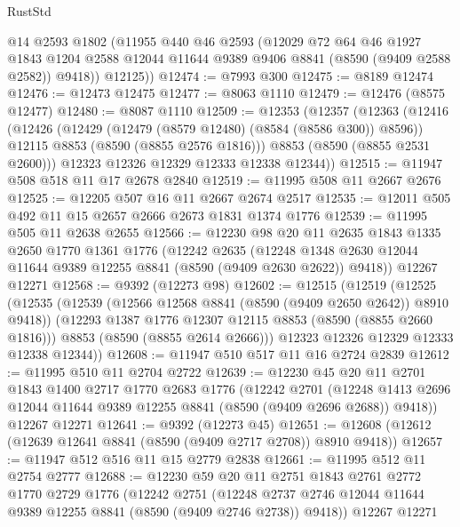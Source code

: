 \begin{lexlean}{RustStd}
\begin{coremodule}
        @14
        @2593
        @1802
        (@11955
          @440
          @46
          @2593
          (@12029
            @72
            @64
            @46
            @1927
            @1843
            @1204
            @2588
            @12044
            @11644
            @9389
            @9406
            @8841
            (@8590 (@9409 @2588 @2582))
            @9418))
        @12125))
@12474 := @7993 @300
@12475 := @8189 @12474
@12476 := @12473 @12475
@12477 := @8063 @1110
@12479 := @12476 (@8575 @12477)
@12480 := @8087 @1110
@12509 := @12353
    (@12357
      (@12363
        (@12416
          (@12426
            (@12429 (@12479 (@8579 @12480) (@8584 (@8586 @300)) @8596))
            @12115
            @8853
            (@8590 (@8855 @2576 @1816)))
          @8853
          (@8590 (@8855 @2531 @2600)))
        @12323
        @12326
        @12329
        @12333
        @12338
        @12344))
@12515 := @11947 @508 @518 @11 @17 @2678 @2840
@12519 := @11995 @508 @11 @2667 @2676
@12525 := @12205 @507 @16 @11 @2667 @2674 @2517
@12535 := @12011 @505 @492 @11 @15 @2657 @2666 @2673 @1831 @1374 @1776
@12539 := @11995 @505 @11 @2638 @2655
@12566 := @12230
    @98
    @20
    @11
    @2635
    @1843
    @1335
    @2650
    @1770
    @1361
    @1776
    (@12242
      @2635
      (@12248 @1348 @2630 @12044 @11644 @9389 @12255 @8841 (@8590 (@9409 @2630 @2622)) @9418))
    @12267
    @12271
@12568 := @9392 (@12273 @98)
@12602 := @12515
    (@12519
      (@12525
        (@12535
          (@12539 (@12566 @12568 @8841 (@8590 (@9409 @2650 @2642)) @8910 @9418))
          (@12293 @1387 @1776 @12307 @12115 @8853 (@8590 (@8855 @2660 @1816)))
          @8853
          (@8590 (@8855 @2614 @2666)))
        @12323
        @12326
        @12329
        @12333
        @12338
        @12344))
@12608 := @11947 @510 @517 @11 @16 @2724 @2839
@12612 := @11995 @510 @11 @2704 @2722
@12639 := @12230
    @45
    @20
    @11
    @2701
    @1843
    @1400
    @2717
    @1770
    @2683
    @1776
    (@12242
      @2701
      (@12248 @1413 @2696 @12044 @11644 @9389 @12255 @8841 (@8590 (@9409 @2696 @2688)) @9418))
    @12267
    @12271
@12641 := @9392 (@12273 @45)
@12651 := @12608 (@12612 (@12639 @12641 @8841 (@8590 (@9409 @2717 @2708)) @8910 @9418))
@12657 := @11947 @512 @516 @11 @15 @2779 @2838
@12661 := @11995 @512 @11 @2754 @2777
@12688 := @12230
    @59
    @20
    @11
    @2751
    @1843
    @2761
    @2772
    @1770
    @2729
    @1776
    (@12242
      @2751
      (@12248 @2737 @2746 @12044 @11644 @9389 @12255 @8841 (@8590 (@9409 @2746 @2738)) @9418))
    @12267
    @12271

\end{coremodule}
\end{lexlean}
